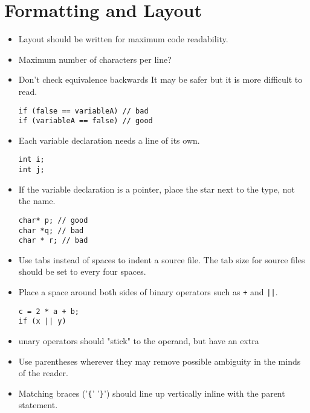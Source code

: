 \documentclass[10pt,a4paper,titlepage,dutch]{report}
\begin{document}

\chapter{Formatting and Layout}

\begin{itemize}

\item Layout should be written for maximum code readability.

\item Maximum number of characters per line?

\item Don't check equivalence backwards It may be safer but it is more
difficult to read.

\verb|if (false == variableA) // bad|\\
\verb|if (variableA == false) // good|

\item Each variable declaration needs a line of its own.

\verb|int i;|\\
\verb|int j;|

\item If the variable declaration is a pointer, place the star next to
the type, not the name.

\verb|char* p; // good|\\
\verb|char *q; // bad|\\
\verb|char * r; // bad|

\item Use tabs instead of spaces to indent a source file. The tab size
for source files should be set to every four spaces.

\item Place a space around both sides of binary operators such as
\verb|+| and \verb+||+.

\verb|c = 2 * a + b;|\\
\verb+if (x || y)+

\item unary operators should "stick" to the operand, but have an extra

\item Use parentheses wherever they may remove possible ambiguity in the
minds of the reader.

\item Matching braces ('\verb|{|' '\verb|}|') should line up vertically
inline with the parent statement.


\end{itemize}
\end{document}
